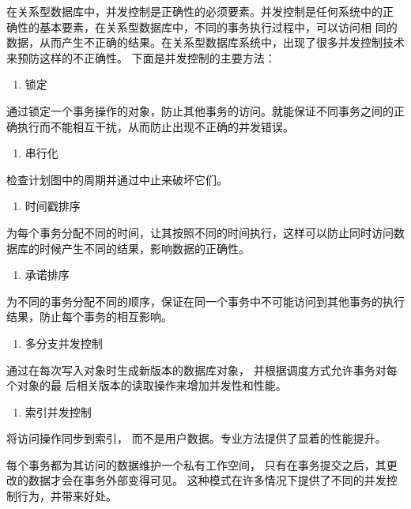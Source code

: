 在关系型数据库中，并发控制是正确性的必须要素。并发控制是任何系统中的正
确性的基本要素，在关系型数据库中，不同的事务执行过程中，可以访问相
同的数据，从而产生不正确的结果。在关系型数据库系统中，出现了很多并发控制技术来预防这样的不正确性。
下面是并发控制的主要方法：

	\begin{enumerate}
		\item 锁定
	\end{enumerate}

	通过锁定一个事务操作的对象，防止其他事务的访问。就能保证不同事务之间的正确执行而不能相互干扰，从而防止出现不正确的并发错误。
	
	\begin{enumerate}[resume]
		\item 串行化
	\end{enumerate}

 检查计划图中的周期并通过中止来破坏它们。
 \begin{enumerate}[resume]
 	\item 时间戳排序
 \end{enumerate}

  为每个事务分配不同的时间，让其按照不同的时间执行，这样可以防止同时访问数据库的时候产生不同的结果，影响数据的正确性。
   
    \begin{enumerate}[resume]
   	\item 承诺排序
   \end{enumerate}

 为不同的事务分配不同的顺序，保证在同一个事务中不可能访问到其他事务的执行结果，防止每个事务的相互影响。
 
\begin{enumerate}[resume]
	\item 多分支并发控制
\end{enumerate}

通过在每次写入对象时生成新版本的数据库对象，
	并根据调度方式允许事务对每个对象的最
	后相关版本的读取操作来增加并发性和性能。
	
	\begin{enumerate}[resume]
		\item 索引并发控制
	\end{enumerate}

将访问操作同步到索引，
而不是用户数据。专业方法提供了显着的性能提升。

每个事务都为其访问的数据维护一个私有工作空间，
只有在事务提交之后，其更改的数据才会在事务外部变得可见。
这种模式在许多情况下提供了不同的并发控制行为，并带来好处。
